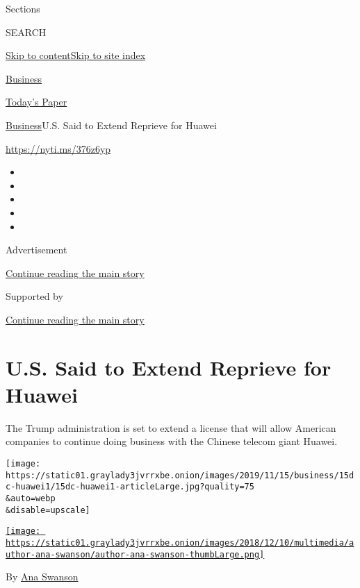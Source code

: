 Sections

SEARCH

\protect\hyperlink{site-content}{Skip to
content}\protect\hyperlink{site-index}{Skip to site index}

\href{https://www.nytimes3xbfgragh.onion/section/business}{Business}

\href{https://myaccount.nytimes3xbfgragh.onion/auth/login?response_type=cookie\&client_id=vi}{}

\href{https://www.nytimes3xbfgragh.onion/section/todayspaper}{Today's
Paper}

\href{/section/business}{Business}\textbar{}U.S. Said to Extend Reprieve
for Huawei

\href{https://nyti.ms/376z6yp}{https://nyti.ms/376z6yp}

\begin{itemize}
\item
\item
\item
\item
\item
\end{itemize}

Advertisement

\protect\hyperlink{after-top}{Continue reading the main story}

Supported by

\protect\hyperlink{after-sponsor}{Continue reading the main story}

\hypertarget{us-said-to-extend-reprieve-for-huawei}{%
\section{U.S. Said to Extend Reprieve for
Huawei}\label{us-said-to-extend-reprieve-for-huawei}}

The Trump administration is set to extend a license that will allow
American companies to continue doing business with the Chinese telecom
giant Huawei.

\texttt{[image: https://static01.graylady3jvrrxbe.onion/images/2019/11/15/business/15dc-huawei1/15dc-huawei1-articleLarge.jpg?quality=75\\\&auto=webp\\\&disable=upscale]}

\href{https://www.nytimes3xbfgragh.onion/by/ana-swanson}{\texttt{[image: https://static01.graylady3jvrrxbe.onion/images/2018/12/10/multimedia/author-ana-swanson/author-ana-swanson-thumbLarge.png]}}

By \href{https://www.nytimes3xbfgragh.onion/by/ana-swanson}{Ana Swanson}

